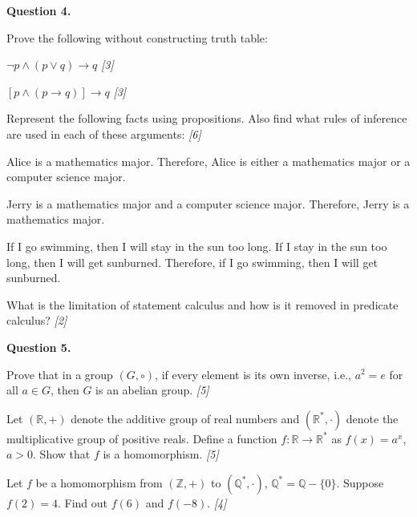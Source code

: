 \documentclass[11pt,a4paper]{article}
\newcommand{\pts}[1]{\hfill\textit{[#1]}}
\begin{document}
\medskip\noindent\textbf{Question 4.}
\begin{parts}
  \item Prove the following without constructing truth table:
  \begin{parts}
    \item $\neg p \land (p \lor q) \to q$ \pts{3}
    \item $[p \land (p \to q)] \to q$ \pts{3}
  \end{parts}
  \item Represent the following facts using propositions. Also find what rules of inference are used in each of these arguments: \pts{6}
  \begin{parts}
    \item Alice is a mathematics major. Therefore, Alice is either a mathematics major or a computer science major.
    \item Jerry is a mathematics major and a computer science major. Therefore, Jerry is a mathematics major.
    \item If I go swimming, then I will stay in the sun too long. If I stay in the sun too long, then I will get sunburned. Therefore, if I go swimming, then I will get sunburned.
  \end{parts}
  \item What is the limitation of statement calculus and how is it removed in predicate calculus? \pts{2}
\end{parts}

\medskip\noindent\textbf{Question 5.}
\begin{parts}
  \item 
  \begin{parts}
    \item Prove that in a group $(G, \circ)$, if every element is its own inverse, i.e., $a^2 = e$ for all $a \in G$, then $G$ is an abelian group. \pts{5}
    \item Let $(\mathbb{R}, +)$ denote the additive group of real numbers and $(\mathbb{R}^*, \cdot)$ denote the multiplicative group of positive reals. Define a function $f: \mathbb{R} \to \mathbb{R}^*$ as $f(x) = a^x$, $a > 0$. Show that $f$ is a homomorphism. \pts{5}
  \end{parts}
  \item Let $f$ be a homomorphism from $(\mathbb{Z}, +)$ to $(\mathbb{Q}^* , \cdot)$, $\mathbb{Q}^* = \mathbb{Q} - \{0\}$. Suppose $f(2) = 4$. Find out $f(6)$ and $f(-8)$. \pts{4}
\end{parts}
\end{document}
